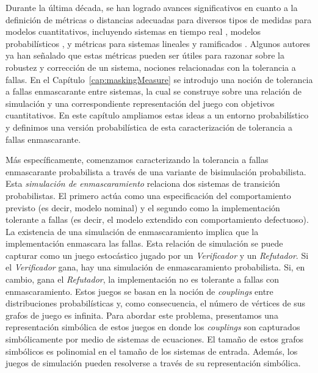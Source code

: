 Durante la última década, se han logrado avances significativos en cuanto a la definición de métricas o distancias adecuadas para diversos tipos de medidas para modelos cuantitativos, incluyendo sistemas en tiempo real \cite{HenzingerMP05}, modelos probabilísticos \cite{Bacci0LM17,BacciBLMTB19,DesharnaisGJP04,DesharnaisLT11,TangB18},
y métricas para sistemas lineales y ramificados \cite{CernyHR12,AlfaroFS09,Henzinger13,LarsenFT11,ThraneFL10}.
Algunos autores ya han señalado que estas métricas pueden ser útiles para razonar
sobre la robustez y corrección de un sistema, nociones relacionadas con la tolerancia a fallas.
En el Capítulo~\ref{cap:maskingMeasure} se introdujo una noción de tolerancia a fallas enmascarante
entre sistemas, la cual se construye sobre una relación de simulación y una correspondiente
representación del juego con objetivos cuantitativos. En este capítulo ampliamos estas ideas a un entorno probabilístico y definimos una versión probabilística de
esta caracterización de tolerancia a fallas enmascarante.

Más específicamente, comenzamos caracterizando la tolerancia a fallas enmascarante probabilista a través de una variante de bisimulación probabilista. Esta \emph{simulación de enmascaramiento} relaciona dos sistemas de transición probabilistas. El primero actúa como una especificación del comportamiento previsto (es decir, modelo nominal) y el segundo como la implementación tolerante a fallas (es decir, el modelo extendido con comportamiento defectuoso). La existencia de una simulación de enmascaramiento implica
que la implementación enmascara las fallas. Esta relación de simulación se puede capturar como un juego estocástico jugado por un
\emph{Verificador} y un \emph{Refutador}. Si el \emph{Verificador} gana, hay una simulación de enmascaramiento probabilista.
Si, en cambio, gana el \emph{Refutador}, la implementación no es tolerante a fallas con enmascaramiento.
Estos juegos se basan en la noción de \textit{couplings} entre distribuciones probabilísticas y, como consecuencia, el número de vértices de sus grafos de juego es infinita. Para abordar este problema, presentamos una representación simbólica de estos juegos en donde los \textit{couplings} son capturados simbólicamente por medio de sistemas de ecuaciones.
El tamaño de estos grafos simbólicos
es polinomial en el tamaño de los sistemas de entrada. Además, los juegos de simulación
pueden resolverse a través de su representación simbólica.

